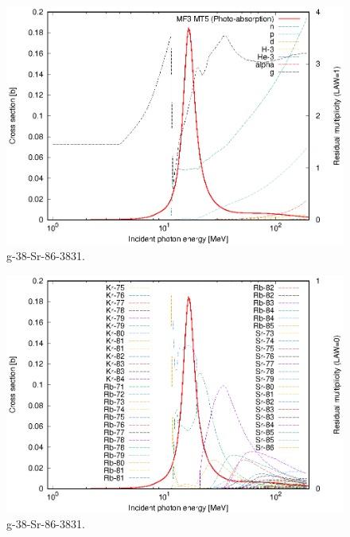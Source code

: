 \begin{figure}
 \includegraphics[width=\linewidth]{eps/g_38-Sr-86_3831.eps}
  \caption{g-38-Sr-86-3831.}
\end{figure}
\begin{figure}
 \includegraphics[width=\linewidth]{eps-law0/g_38-Sr-86_3831.eps}
 \caption{g-38-Sr-86-3831.}
\end{figure}
\newpage \clearpage


